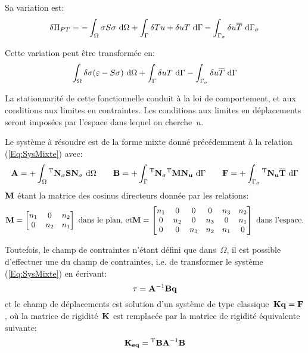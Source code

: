 \medskip
Sa variation est:
\begin{equation}
  \label{Eq:deltaPiPT}
  \delta\Pi_{PT} =
    -\displaystyle\int_{\Omega} \sigma S\sigma\ \text{d}\Omega
    +\displaystyle\int_{\Gamma} \delta Tu+\delta uT\ \text{d}\Gamma
    -\displaystyle\int_{\Gamma_\sigma} \delta u \overline{T}\ \text{d}\Gamma_\sigma
\end{equation}

\medskip
Cette variation peut être transformée en:
\[
  \displaystyle\int_\Omega \delta \sigma (\varepsilon- S\sigma) \ \text{d}\Omega
  +\displaystyle\int_{\Gamma} \delta uT\ \text{d}\Gamma
  -\displaystyle\int_{\Gamma_\sigma} \delta u\overline{T}\ \text{d}\Gamma
\]

\medskip
La stationnarité de cette fonctionnelle conduit à la loi de
comportement, et aux conditions aux limites en contraintes.
Les conditions aux limites en déplacements seront imposées par l'espace
dans lequel on cherche~$u$.

\medskip
Le système à résoudre est de la forme mixte donné précédemment à la relation (\ref{Eq:SysMixte})
avec:
\begin{equation}
  \MM{A} = +\dint_{\Omega} \MMT{N_\sigma}\MM{S}\MM{N_\sigma}\ \dd\Omega
\qquad
  \MM{B} = +\dint_{\Gamma} \MMT{N_\sigma}\MMT{M}\MM{N_u}\ \dd\Gamma
\qquad
  \VV{F} = +\dint_{\ls} \MMT{N_u}\VV{\Tbar} \ \dd\Gamma
\end{equation}
$\MM{M}$ étant la matrice des cosinus directeurs donnée
par les relations:
\begin{equation}
  \MM{M}=\MM*{n_1& 0&n_2\\
          0&n_2&n_1}
\text{ dans le plan, et}%
  \MM{M}=\MM*{n_1& 0& 0& 0&n_3&n_2\\
          0&n_2& 0&n_3& 0&n_1\\
          0& 0&n_3&n_2&n_1& 0}
\text{ dans l'espace.}
\end{equation}

\bigskip
Toutefois, le champ de contraintes n'étant défini que dans~$\Omega$,
il est possible d'effectuer une  du
champ de contraintes, i.e. de transformer le système
(\ref{Eq:SysMixte}) en écrivant:
\begin{equation}
  \label{Eq:TauQ}
   \VV{\tau} = \MMI{A}\MM{B}\VV{q}
\end{equation}
et le champ de déplacements est solution d'un système de type
classique~$\MM{K}\VV{q}=\VV{F}$, où la matrice de rigidité~$\MM{K}$ est remplacée
par la matrice de rigidité équivalente suivante:
\begin{equation}
  \MM{K_{eq}} = \MMT{B}\MMI{A}\MM{B}
\end{equation}


